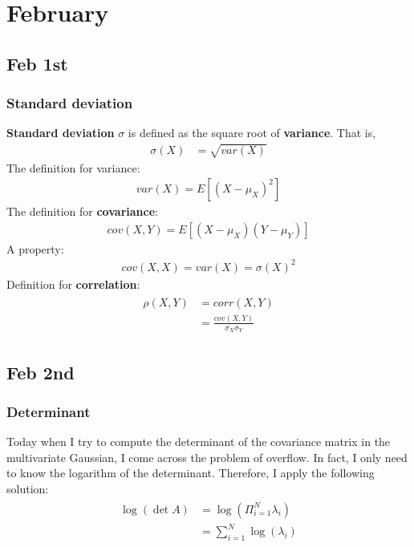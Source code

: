 \chapter{February}

\section{Feb 1st}
\subsection{Standard deviation} 
\textbf{Standard deviation} $\sigma$ is defined as the square root of \textbf{variance}. That is,
\begin{align}
	\sigma(X) &= \sqrt{var(X)}
\end{align}
The definition for variance:
\begin{align}
var(X) = E[(X - \mu_X)^2]
\end{align}
The definition for \textbf{covariance}:
\begin{align}
cov(X,Y) = E[(X - \mu_X)(Y- \mu_Y)]
\end{align}
A property:
\begin{align}
	cov(X,X) = var(X) = \sigma(X)^2 
\end{align}
Definition for \textbf{correlation}:
\begin{align}
	\begin{split}
	\rho(X,Y) & = corr(X, Y) 		\\
			  & = \frac{cov(X,Y)}{\sigma_X \sigma_Y}
	\end{split}
\end{align}

\section{Feb 2nd}

\subsection{Determinant}
Today when I try to compute the determinant of the covariance matrix in the multivariate Gaussian, I come across the problem of overflow. In fact, I only
need to know the logarithm of the determinant. Therefore, I apply the following solution:
\begin{align}
	\begin{split}
	\log(\det A) &= \log(\Pi_{i=1}^{N} \lambda_i)  \\
				 & = \sum_{i=1}^{N} \log(\lambda_i)
	\end{split}
\end{align}

